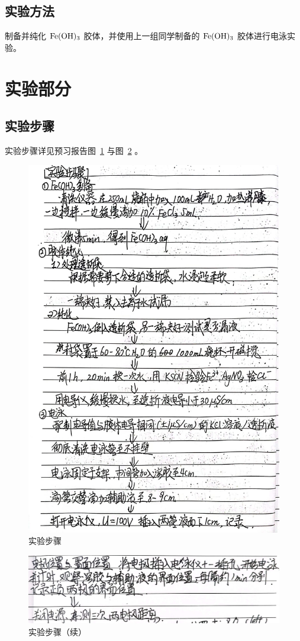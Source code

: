 \documentclass[cn,hazy,pku,12pt,normal,math=newtx,cite=super]{elegantnote}
\begin{document}
\subsection{实验方法}

制备并纯化 $\rm Fe(OH)_3$ 胶体，并使用上一组同学制备的 $\rm Fe(OH)_3$ 胶体进行电泳实验。

\section{实验部分}

\subsection{实验步骤}

实验步骤详见预习报告图~\ref{b} 与图~\ref{4} 。
\begin{figure}[htbp]
    \centering
    \includegraphics[width = .70\textwidth]{image/yxbg_2.jpg}
    \caption{实验步骤}\label{b}
\end{figure}

\begin{figure}[htbp]
    \centering
    \includegraphics[width = .70\textwidth]{image/yxbg_3.jpg}
    \caption{实验步骤（续）}\label{4}
\end{figure}
\end{document}

